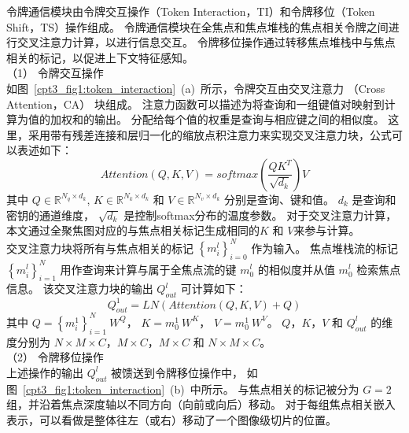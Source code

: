 令牌通信模块由令牌交互操作（Token Interaction，TI）和令牌移位（Token Shift，TS）操作组成。 
令牌通信模块在全焦点和焦点堆栈的焦点相关令牌之间进行交叉注意力计算，以进行信息交互。 
令牌移位操作通过转移焦点堆栈中与焦点相关的标记，以促进上下文特征感知。 
\\
%
%
%
%
\indent
（1）
令牌交互操作
\\
%
%
%
%
\indent
如图~\ref{cpt3_fig1:token_interaction}~(a)~所示，令牌交互由交叉注意力
（Cross Attention，CA）
块组成。 
注意力函数可以描述为将查询和一组键值对映射到计算为值的加权和的输出。 
分配给每个值的权重是查询与相应键之间的相似度。 
这里，采用带有残差连接和层归一化的缩放点积注意力来实现交叉注意力块，公式可以表述如下：
%
%
%
\begin{equation}
	Attention(Q,K,V) = softmax \left ( \frac{QK^{T}}{\sqrt{d_{k}}} \right ) V
\end{equation}
%
%
其中
$ Q \in \mathbb{R}^{N_{q}\times d_{k}}  $,
$ K \in \mathbb{R}^{N_{k}\times d_{k}}  $ 和
$ V \in \mathbb{R}^{N_{v}\times d_{k}}  $ 
分别是查询、键和值。 
$ d_{k} $ 是查询和密钥的通道维度，
$ \sqrt{d_{k}} $ 是控制softmax分布的温度参数。 
对于交叉注意力计算，
本文通过全聚焦图对应的与焦点相关标记生成相同的$K$ 和 $V$来参与计算。 
\\
%
%
%
%
\indent
交叉注意力块将所有与焦点相关的标记 $ \left \{ m_{i}^{l} \right \}_{i=0}^{N} $ 作为输入。 焦点堆栈流的标记 $ \left \{  m_{i}^{l} \right \}_{i=1}^{N} $ 用作查询来计算与属于全焦点流的键 $ m_{0}^{l} $ 的相似度并从值 $ m_{0}^{l} $ 检索焦点信息。 该交叉注意力块的输出 $ Q_{out}^{l} $ 可计算如下：
%
%
\begin{equation}
	Q_{out}^{1} = LN \left ( Attention(Q,K,V) + Q \right )
\end{equation}
%
%
其中
$ Q = \left \{ m_{i}^{1} \right \}_{i=1}^{N}~ W^{Q}$，
$ K= m_{0}^{1} ~W^{K} $，
$ V =  m_{0}^{1}~ W^{V} $。
$ Q$，$K$，$V$ 和 $ Q_{out}^{l} $
的维度分别为 
$ N \times M \times C $，$ M \times C $，$ M \times C $ 
和
 $ N \times M \times C $。 
\\
%
%
%
%
\indent
（2）
令牌移位操作
\\
%
%
%
%
\indent
上述操作的输出 $ Q_{out}^{l} $ 被馈送到令牌移位操作中，
如图~\ref{cpt3_fig1:token_interaction}~(b)~中所示。 
与焦点相关的标记被分为 $G = 2$ 组，并沿着焦点深度轴以不同方向（向前或向后）移动。 
对于每组焦点相关嵌入表示，可以看做是整体往左（或右）移动了一个图像级切片的位置。

